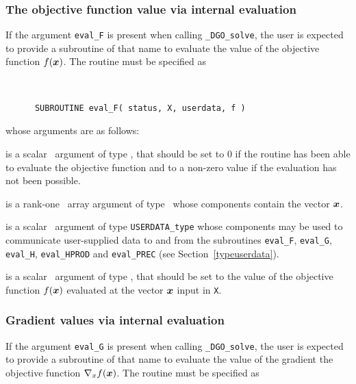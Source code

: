 \documentclass{galahad}
\newcommand{\packagename}{DGO}
\newcommand{\fullpackagename}{\libraryname\_\packagename}
\newcommand{\solver}{{\tt \fullpackagename\_solve}}
\begin{document}

\subsubsection{The objective function value via internal evaluation\label{ffv}}

If the argument {\tt eval\_F} is present when calling \solver, the
user is expected to provide a subroutine of that name to evaluate the
value of the objective function $f({\bm{x}})$.
The routine must be specified as

\def\baselinestretch{0.8}
{\tt
\begin{verbatim}
      SUBROUTINE eval_F( status, X, userdata, f )
\end{verbatim}
}
\def\baselinestretch{1.0}
\noindent whose arguments are as follows:

\begin{description}
 is a scalar \intentout\ argument of type \integer,
that should be set to 0 if the routine has been able to evaluate
the objective function
and to a non-zero value if the evaluation has not been possible.

 is a rank-one \intentin\ array argument of type \realdp\
whose components contain the vector ${\bm{x}}$.

 is a scalar \intentinout\ argument of type
{\tt USERDATA\_type} whose components may be used
to communicate user-supplied data to and from the
subroutines {\tt eval\_F}, {\tt eval\_G},
{\tt eval\_H}, {\tt eval\_HPROD} and {\tt eval\_PREC}
(see Section~\ref{typeuserdata}).

 is a scalar \intentout\ argument of type \realdp,
that should be set to the value of the objective function $f({\bm{x}})$
evaluated at the vector ${\bm{x}}$ input in {\tt X}.

\end{description}


\subsubsection{Gradient values via internal evaluation\label{gfv}}

If the argument {\tt eval\_G} is present when calling \solver, the
user is expected to provide a subroutine of that name to evaluate the
value of the gradient the objective function $\nabla_x f({\bm{x}})$.
The routine must be specified as
\end{document}
